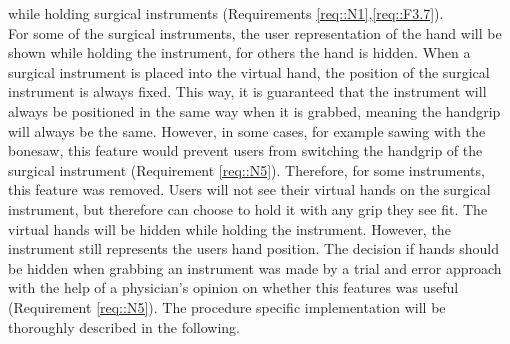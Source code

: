 while holding surgical instruments (Requirements \ref{req::N1},\ref{req::F3.7}).
\\ For some of the surgical instruments, the user representation of the hand will be shown while holding the instrument, for others the hand is hidden.
When a surgical instrument is placed into the virtual hand, the position of the surgical instrument is always fixed.
This way, it is guaranteed that the instrument will always be positioned in the same way when it is grabbed, meaning the handgrip will always be the same.
However, in some cases, for example sawing with the bonesaw, this feature would prevent users from switching the handgrip of the surgical instrument (Requirement \ref{req::N5}). 
Therefore, for some instruments, this feature was removed.
Users will not see their virtual hands on the surgical instrument, but therefore can choose to hold it with any grip they see fit.
The virtual hands will be hidden while holding the instrument.
However, the instrument still represents the users hand position.
The decision if hands should be hidden when grabbing an instrument was made by a trial and error approach with the help of a physician's opinion on whether 
this features was useful (Requirement \ref{req::N5}).
The procedure specific implementation will be thoroughly described in the following.






